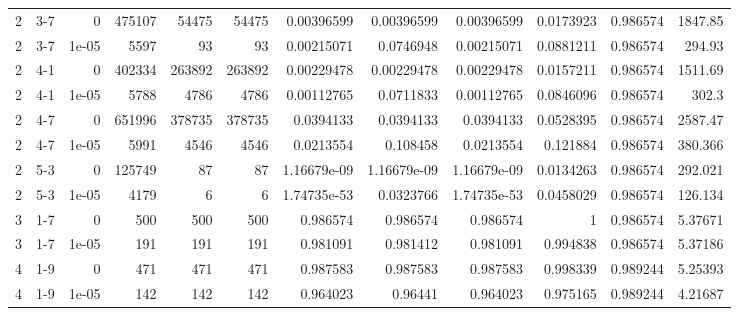 \begin{tabular}{rlrrrrrrrrrr}
     2 & 3-7    &      0     &      475107 &             54475 &             54475 &     0.00396599  &     0.00396599  &      0.00396599  &        0.0173923 &               0.986574 &         1847.85    \\
     2 & 3-7    &      1e-05 &        5597 &                93 &                93 &     0.00215071  &     0.0746948   &      0.00215071  &        0.0881211 &               0.986574 &          294.93    \\
     2 & 4-1    &      0     &      402334 &            263892 &            263892 &     0.00229478  &     0.00229478  &      0.00229478  &        0.0157211 &               0.986574 &         1511.69    \\
     2 & 4-1    &      1e-05 &        5788 &              4786 &              4786 &     0.00112765  &     0.0711833   &      0.00112765  &        0.0846096 &               0.986574 &          302.3     \\
     2 & 4-7    &      0     &      651996 &            378735 &            378735 &     0.0394133   &     0.0394133   &      0.0394133   &        0.0528395 &               0.986574 &         2587.47    \\
     2 & 4-7    &      1e-05 &        5991 &              4546 &              4546 &     0.0213554   &     0.108458    &      0.0213554   &        0.121884  &               0.986574 &          380.366   \\
     2 & 5-3    &      0     &      125749 &                87 &                87 &     1.16679e-09 &     1.16679e-09 &      1.16679e-09 &        0.0134263 &               0.986574 &          292.021   \\
     2 & 5-3    &      1e-05 &        4179 &                 6 &                 6 &     1.74735e-53 &     0.0323766   &      1.74735e-53 &        0.0458029 &               0.986574 &          126.134   \\
     3 & 1-7    &      0     &         500 &               500 &               500 &     0.986574    &     0.986574    &      0.986574    &        1         &               0.986574 &            5.37671 \\
     3 & 1-7    &      1e-05 &         191 &               191 &               191 &     0.981091    &     0.981412    &      0.981091    &        0.994838  &               0.986574 &            5.37186 \\
     4 & 1-9    &      0     &         471 &               471 &               471 &     0.987583    &     0.987583    &      0.987583    &        0.998339  &               0.989244 &            5.25393 \\
     4 & 1-9    &      1e-05 &         142 &               142 &               142 &     0.964023    &     0.96441     &      0.964023    &        0.975165  &               0.989244 &            4.21687 \\
\hline
\end{tabular}
